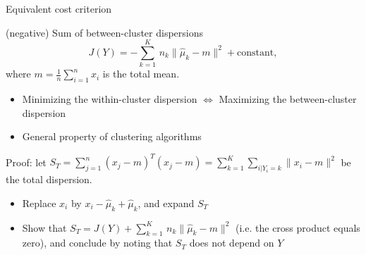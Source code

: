 \documentclass[compress, smaller, serif, 9pt]{beamer}
\newcommand{\structuretext}[1]{{\usebeamercolor[fg]{structure} #1}}
\newcommand{\doigt}{\structuretext{\noindent \Pisymbol{pzd}{43}}}
\begin{document}
\begin{frame}{Equivalent cost criterion}
\begin{block}{(negative) Sum of between-cluster dispersions}
$$
J(Y)= - \sum_{k=1}^K \,  n_k \| \widehat{\mu}_k- m \|^2 + \textrm{constant},
$$
where $m=\frac{1}{n} \sum_{i=1}^n x_i$ is the total mean.
\begin{itemize}
 \item[\doigt] Minimizing the within-cluster dispersion $\Leftrightarrow$ Maximizing the  between-cluster dispersion
 \item[\doigt] General property of clustering algorithms
\end{itemize}
\end{block}
\medskip

\structuretext{Proof:} let $S_T= \sum_{j=1}^n (x_j-m)^T(x_j-m)= \sum_{k=1}^K   \sum_{i|Y_i=k} \| x_i- m \|^2$ be the total dispersion.
\begin{itemize}
 \item Replace $x_i$ by $x_i-\widehat{\mu}_k + \widehat{\mu}_k$, and expand $S_T$
 \item Show that $S_T= J(Y) +  \sum_{k=1}^K \,  n_k \| \widehat{\mu}_k- m \|^2$ (i.e. the cross product equals zero), and conclude by noting that 
  $S_T$ does not depend on $Y$
\end{itemize}
\end{frame}
\end{document}
